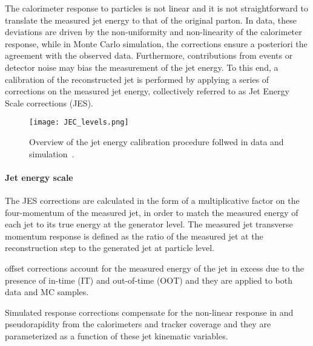 The calorimeter response to particles is not linear and it is not straightforward to translate the measured jet energy
to that of the original parton.
In data, these deviations are driven by the non-uniformity and non-linearity of the calorimeter response,
while in Monte Carlo simulation, the corrections ensure a posteriori the agreement with the observed data.
Furthermore, contributions from \pileup{} events or detector noise may bias the measurement of the jet energy.
To this end, a calibration of the reconstructed jet is performed by applying a series of corrections on the measured jet energy,
collectively referred to as Jet Energy Scale corrections (JES).

\begin{figure}
\centering
\texttt{[image: JEC\_levels.png]}
\caption{Overview of the jet energy calibration procedure follwed in data and simulation~\cite{CMS-JME-13-004}.}
\label{fig:JECoverview}
\end{figure}


\paragraph{Jet energy scale\\}
The JES corrections are calculated in the form of a multiplicative factor on the four-momentum of the measured jet,
in order to match the measured energy of each jet to its true energy at the generator level.
The measured jet transverse momentum response is defined as the ratio of the measured jet \pt at the reconstruction step to the generated jet at particle level.

\Pileup{} offset corrections account for the measured energy of the jet in excess due to
the presence of in-time (IT) and out-of-time (OOT) \pileup{}
and they are applied to both data and MC samples.

Simulated response corrections compensate for the non-linear response in \pt and pseudorapidity
from the calorimeters and tracker coverage and they are parameterized as a function of these jet kinematic variables.

